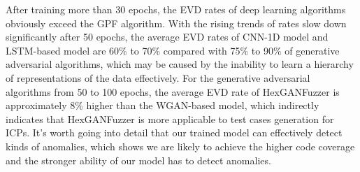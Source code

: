 After training more than 30 epochs, the EVD rates of deep learning algorithms obviously exceed the GPF algorithm. With the rising trends of rates slow down significantly after 50 epochs, the average EVD rates of CNN-1D model and LSTM-based model are 60\% to 70\% compared with 75\% to 90\% of generative adversarial algorithms, which may be caused by the inability to learn a hierarchy of representations of the data effectively. For the generative adversarial algorithms from 50 to 100 epochs, the average EVD rate of HexGANFuzzer is approximately 8\% higher than the WGAN-based model, which indirectly indicates that HexGANFuzzer is more applicable to test cases generation for ICPs. %
It's worth going into detail that our trained model can effectively detect kinds of anomalies, which shows we are likely to achieve the higher code coverage and the stronger ability of our model has to detect anomalies.

